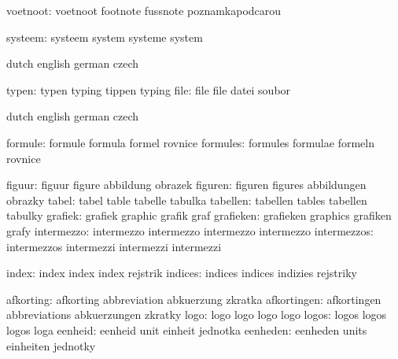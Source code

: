            voetnoot:  voetnoot             footnote            fussnote
                      poznamkapodcarou

            systeem:  systeem              system              systeme
                      system

\stopvariables

\startvariables       dutch                english             german
                      czech

              typen:  typen                typing              tippen
                      typing
               file:  file                 file                datei
                      soubor

\stopvariables




\startvariables       dutch                english             german
                      czech

            formule:  formule              formula             formel
                      rovnice
           formules:  formules             formulae            formeln
                      rovnice

             figuur:  figuur               figure              abbildung
                      obrazek
            figuren:  figuren              figures             abbildungen
                      obrazky
              tabel:  tabel                table               tabelle
                      tabulka
           tabellen:  tabellen             tables              tabellen
                      tabulky
            grafiek:  grafiek              graphic             grafik
                      graf
          grafieken:  grafieken            graphics            grafiken
                      grafy
         intermezzo:  intermezzo           intermezzo          intermezzo
                      intermezzo
        intermezzos:  intermezzos          intermezzi          intermezzi
                      intermezzi

              index:  index                index               index
                      rejstrik
            indices:  indices              indices             indizies
                      rejstriky

          afkorting:  afkorting            abbreviation        abkuerzung
                      zkratka
        afkortingen:  afkortingen          abbreviations       abkuerzungen
                      zkratky
               logo:  logo                 logo                logo
                      logo
              logos:  logos                logos               logos
                      loga
            eenheid:  eenheid              unit                einheit
                      jednotka
           eenheden:  eenheden             units               einheiten
                      jednotky

